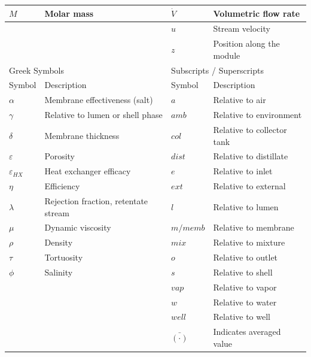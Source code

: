 \documentclass[14pt,letterpaper,fleqn]{extarticle}
\renewcommand{\textbf}[1]{#1}
\begin{document}
{\begin{tabular}{|p{1.8cm}|p{5.5cm}||p{1.8cm}|p{5.5cm}|}
\hline
$M$        & Molar mass &
$\dot{V}$  & Volumetric flow rate \\
\hline
           &  &
$u$        & Stream velocity \\
\hline
           &  &
$z$        & Position along the module \\
\hline
\multicolumn{2}{|l||}{\textbf{Greek Symbols}} &
\multicolumn{2}{l|}{\textbf{Subscripts / Superscripts}} \\
\hline
\textbf{Symbol} & \textbf{Description} &
\textbf{Symbol} & \textbf{Description} \\
\hline
$\alpha$           & Membrane effectiveness (salt) &
$a$                & Relative to air \\
\hline
$\gamma$           & Relative to lumen or shell phase &
$amb$              & Relative to environment \\
\hline
$\delta$           & Membrane thickness &
$col$              & Relative to collector tank \\
\hline
$\varepsilon$      & Porosity &
$dist$             & Relative to distillate \\
\hline
$\varepsilon_{HX}$ & Heat exchanger efficacy &
$e$                & Relative to inlet \\
\hline
$\eta$             & Efficiency &
$ext$              & Relative to external \\
\hline
$\lambda$          & Rejection fraction, retentate stream &
$l$                & Relative to lumen \\
\hline
$\mu$              & Dynamic viscosity &
$m/memb$           & Relative to membrane \\
\hline
$\rho$             & Density &
$mix$              & Relative to mixture \\
\hline
$\tau$             & Tortuosity &
$o$                & Relative to outlet \\
\hline
$\phi$             & Salinity &
$s$                & Relative to shell \\
\hline
                   &  &
$vap$              & Relative to vapor \\
\hline
                   &  &
$w$                & Relative to water \\
\hline
                   &  &
$well$             & Relative to well \\
\hline
                   &  &
$\bar{(\cdot)}$    & Indicates averaged value \\
\hline
\end{tabular}
}
\end{document}

